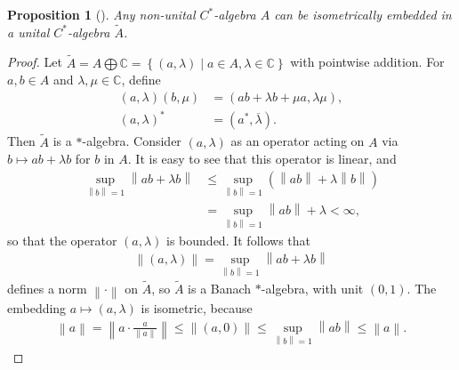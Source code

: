 \documentclass[11pt,a4paper]{report}
\theoremstyle{plain}
\newtheorem*{prop*}{Proposition}
\theoremstyle{definition}
\newcommand{\1}{\mathbbm{1}}
\newcommand{\C}{\mathbb{C}}
\renewcommand{\oplus}{\textstyle\bigoplus}
\begin{document}
\begin{prop*}[{\cite[I.1.3]{davidson96}}]\label{prop:unit}
	Any non-unital $C^\ast$-algebra $A$ can be isometrically embedded in a unital 
	$C^\ast$-algebra $\tilde{A}$.
\end{prop*}
\begin{proof}
	Let $\tilde{A} = A \oplus \C = \left\{(a,\lambda) \mid a\in A, \lambda \in 
	\C\right\}$  with pointwise addition. For $a, b \in A$ and $\lambda,\mu 
	\in \C$, define
	\begin{align*}
		(a,\lambda) (b,\mu) &= (ab+\lambda b + \mu a, \lambda \mu),								\\
		(a,\lambda)^\ast &= (a^\ast,\overline{\lambda}).
	\end{align*}
	Then $\tilde{A}$ is a $\ast$-algebra. 
	Consider $(a,\lambda)$ as an operator acting on $A$ via $b\mapsto ab+\lambda b$ 
	for $b$ in $A$. It is easy to see that this operator is linear, and 
	\begin{align*}
				\sup_{\left\|b\right\|=1}\left\|ab+\lambda b\right\| 
		&\leq 	\sup_{\left\|b\right\|=1} (\left\|ab\right\|+ \lambda\left\|b\right\|)			\\
		&=		\sup_{\left\|b\right\|=1} \left\|ab\right\|+ \lambda < \infty,
	\end{align*}
	so that the operator $(a,\lambda)$ is bounded. It follows that
	\begin{align*}
		\left\|(a,\lambda)\right\| = \sup_{\left\|b\right\|=1}\left\|ab+\lambda b\right\|
	\end{align*}
	defines a norm $\left\|\cdot\right\|$ on $\tilde{A}$, so $\tilde{A}$ is a 
	Banach $\ast$-algebra, with unit $(0,1)$.
	The embedding $a\mapsto(a,\lambda)$ is isometric, because 
	\begin{align*}
		\left\|a\right\| = \left\|a\cdot\frac{a}{\left\|a\right\|}\right\| 
						 \leq \left\|(a,0)\right\| 
						 \leq \sup_{\left\|b\right\|=1}{\left\|ab\right\|} 
						 \leq \left\|a\right\|.
	\end{align*}
	

\end{proof}
\end{document}
